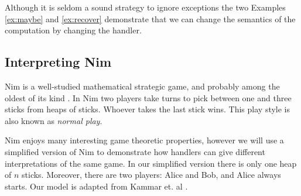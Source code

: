 Although it is seldom a sound strategy to ignore exceptions the two Examples \ref{ex:maybe} and \ref{ex:recover} demonstrate that we can change the semantics of the computation by changing the handler.

\subsection{Interpreting Nim}\label{sec:interpreting-nim}
Nim is a well-studied mathematical strategic game, and probably among the oldest of its kind \cite{Joergensen2009}. In Nim two players take turns to pick between one and three sticks from heaps of sticks. Whoever takes the last stick wins. This play style is also known as \emph{normal play}. 

Nim enjoys many interesting game theoretic properties, however we will use a simplified version of Nim to demonstrate how handlers can give different interpretations of the same game. In our simplified version there is only one heap of $n$ sticks. Moreover, there are two players: Alice and Bob, and Alice always starts. Our model is adapted from Kammar et. al \cite{Kammar2013}.


